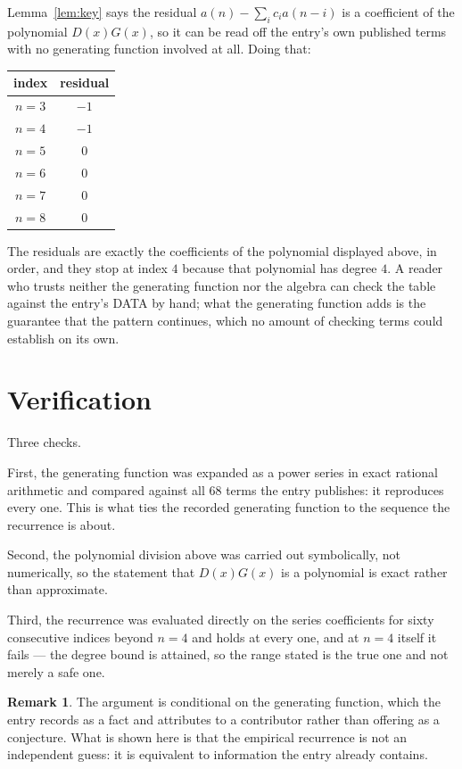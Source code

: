 \documentclass[11pt,a4paper]{article}
\theoremstyle{plain}
\theoremstyle{definition}
\newtheorem{remark}[theorem]{Remark}
\begin{document}
Lemma~\ref{lem:key} says the residual $a(n)-\sum_ic_ia(n-i)$ is a coefficient of the
polynomial $D(x)G(x)$, so it can be read off the entry's own published terms with no
generating function involved at all. Doing that:
\begin{center}
\begin{tabular}{cc}
index & residual \\ \hline
$n=3$ & $-1$ \\
$n=4$ & $-1$ \\
$n=5$ & $0$ \\
$n=6$ & $0$ \\
$n=7$ & $0$ \\
$n=8$ & $0$
\end{tabular}
\end{center}
The residuals are exactly the coefficients of the polynomial displayed above, in order, and
they stop at index $4$ because that polynomial has degree $4$. A reader who trusts
neither the generating function nor the algebra can check the table against the entry's DATA
by hand; what the generating function adds is the guarantee that the pattern continues, which
no amount of checking terms could establish on its own.

\section{Verification}

Three checks.

First, the generating function was expanded as a power series in exact rational arithmetic and
compared against all $68$ terms the entry publishes: it reproduces every one. This is
what ties the recorded generating function to the sequence the recurrence is about.

Second, the polynomial division above was carried out symbolically, not numerically, so the
statement that $D(x)G(x)$ is a polynomial is exact rather than approximate.

Third, the recurrence was evaluated directly on the series coefficients for sixty consecutive
indices beyond $n=4$ and holds at every one, and at $n=4$ itself it fails --- the
degree bound is attained, so the range stated is the true one and not merely a safe one.

\begin{remark}
The argument is conditional on the generating function, which the entry records as a fact and
attributes to a contributor rather than offering as a conjecture. What is shown here is that
the empirical recurrence is not an independent guess: it is equivalent to information the
entry already contains.
\end{remark}
\end{document}

